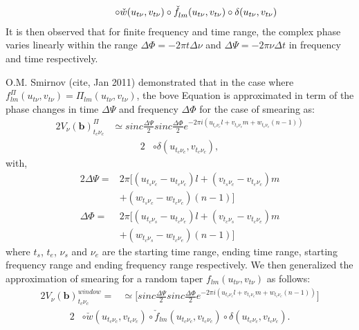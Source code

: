 \begin{alignat}{2}				 
		     \hspace{1.2cm}\circ \check{w}(u_{t\nu},v_{t\nu})\circ \check{f}^{}_{lm}(u_{t\nu},v_{t\nu})\circ\delta(u_{t\nu},v_{t\nu})\label{eq:5} 
\end{alignat}
It is then observed that for finite frequency and time range, the complex phase varies linearly within the range
$\Delta \Phi = −2\pi t\Delta \nu$ and $\Delta \Psi= −2\pi\nu\Delta t$ in frequency and time respectively.


O.M. Smirnov (cite, Jan 2011) demonstrated that in the case where $f^{\Pi}_{lm}(u_{t\nu},v_{t\nu})=\Pi_{lm}(u_{t\nu},v_{t\nu})$, the bove Equation is approximated in term of the
phase changes in time $\Delta \Psi$ and frequency  $\Delta \Phi$ for the case
of smearing as:
\begin{alignat*}{2}
V_{\nu}(\mathbf{b})^{\Pi}_{t_c \nu_c} &\simeq sinc\frac{\Delta \Psi}{2}sinc\frac{\Delta \Phi}{2}e^{-2\pi i (u_{t_c\nu_c}l+v_{t_c\nu_c}m+w_{t_c\nu_c}(n-1))}
\end{alignat*}
\begin{alignat}{2}
				      &\circ \delta(u_{t_c\nu_c},v_{t_c\nu_c})\label{eq:6},
\end{alignat}
with,
\begin{alignat*}{2}
\Delta \Psi =&2\pi \Big[(u_{t_s\nu_c}-u_{t_e\nu_c})l + (v_{t_s\nu_c}-v_{t_e\nu_c})m\\
	    & +(w_{t_s\nu_c}-w_{t_e\nu_c})(n-1)\Big]\\
\Delta \Phi =&2\pi \Big[(u_{t_c\nu_s}-u_{t_c\nu_e})l + (v_{t_c\nu_s}-v_{t_c\nu_e})m\\
	    & +(w_{t_c\nu_s}-w_{t_c\nu_e})(n-1)\Big]
\end{alignat*}
where $t_s$, $t_e$, $\nu_s$ and $\nu_e$ are the starting time range, ending time range, starting frequency range and ending frequency
range respectively.
We then generalized the approximation of smearing for a
random taper $f_{lm}(u_{t\nu},v_{t\nu})$ as follows:
\begin{alignat*}{2}
V_{\nu}(\mathbf{b})^{window}_{t_c \nu_c} =&\simeq \Bigg[sinc\frac{\Delta \Psi}{2}sinc\frac{\Delta \Phi}{2}e^{-2\pi i (u_{t_c\nu_c}l+v_{t_c\nu_c}m+w_{t_c\nu_c}(n-1))}\Bigg]
\end{alignat*}
\begin{alignat}{2}
					  & \circ \check{w}(u_{t_c\nu_c},v_{t_c\nu_c})\circ \check{f}_{lm}(u_{t_c\nu_c},v_{t_c\nu_c})\circ \delta(u_{t_c\nu_c},v_{t_c\nu_c})\label{eq:5}.
\end{alignat}
